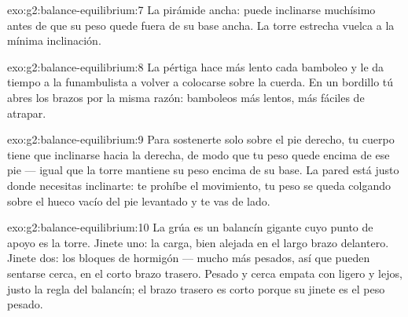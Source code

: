 \begin{solution}{exo:g2:balance-equilibrium:7}
La pirámide ancha: puede inclinarse muchísimo antes de que su peso
quede fuera de su base ancha. La torre estrecha vuelca a la mínima
inclinación.
\end{solution}

\begin{solution}{exo:g2:balance-equilibrium:8}
La pértiga hace más lento cada bamboleo y le da tiempo a la
funambulista a volver a colocarse sobre la cuerda. En un bordillo tú
abres los brazos por la misma razón: bamboleos más lentos, más fáciles
de atrapar.
\end{solution}

\begin{solution}{exo:g2:balance-equilibrium:9}
Para sostenerte solo sobre el pie derecho, tu cuerpo tiene que
inclinarse hacia la derecha, de modo que tu peso quede encima de ese
pie --- igual que la torre mantiene su peso encima de su base. La
pared está justo donde necesitas inclinarte: te prohíbe el
movimiento, tu peso se queda colgando sobre el hueco vacío del pie
levantado y te vas de lado.
\end{solution}

\begin{solution}{exo:g2:balance-equilibrium:10}
La grúa es un balancín gigante cuyo punto de apoyo es la torre. Jinete
uno: la carga, bien alejada en el largo brazo delantero. Jinete dos:
los bloques de hormigón --- mucho más pesados, así que pueden sentarse
cerca, en el corto brazo trasero. Pesado y cerca empata con ligero y
lejos, justo la regla del balancín; el brazo trasero es corto porque
su jinete es el peso pesado.
\end{solution}
